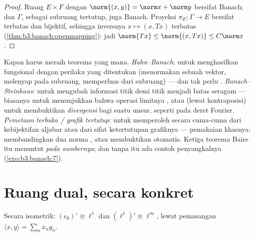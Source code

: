 \begin{proof}
Ruang $E \times F$ dengan $\norm{(x,y)} = \norm x + \norm y$ bersifat Banach;
dan $\Gamma$, sebagai subruang tertutup, juga Banach. Proyeksi
$\pi_E\colon \Gamma \to E$ bersifat terbatas dan bijektif, sehingga
inversnya $x \mapsto (x, Tx)$ terbatas
(\cref{thm:b3:banach:openmapping}): jadi $\norm{Tx} \leq \norm{(x,
Tx)} \leq C\norm x$.
\end{proof}

\begin{method}\label{met:b3:banach:trilogy}
Kapan harus meraih teorema yang mana. \emph{Hahn--Banach}: untuk
menghasilkan fungsional dengan perilaku yang ditentukan (menormakan sebuah
vektor, melenyap pada subruang, memperluas dari subruang) ---
dan tak perlu . \emph{Banach--Steinhaus}: untuk mengubah
informasi titik demi titik menjadi batas seragam --- biasanya untuk menunjukkan
bahwa operasi limitnya , atau (lewat kontraposisi) untuk membuktikan
\emph{divergensi} bagi suatu unsur, seperti pada deret Fourier.
\emph{Pemetaan terbuka / grafik tertutup}: untuk memperoleh  secara cuma-cuma
dari kebijektifan aljabar atau dari sifat ketertutupan
grafiknya --- pemakaian khasnya: membandingkan dua norma , atau membuktikan
 otomatis. Ketiga teorema Baire itu menuntut
 \emph{pada sumbernya}; dan tanpa itu ada contoh penyangkalnya
(\cref{exo:b3:banach:7}).
\end{method}

\section{Ruang dual, secara konkret}

\begin{theorem}\label{thm:b3:banach:duals}
Secara isometrik: $(c_0)' \cong \ell^1$ dan $(\ell^1)' \cong
\ell^\infty$, lewat pemasangan $\langle x, y\rangle = \sum_n
x_ny_n$.
\end{theorem}

